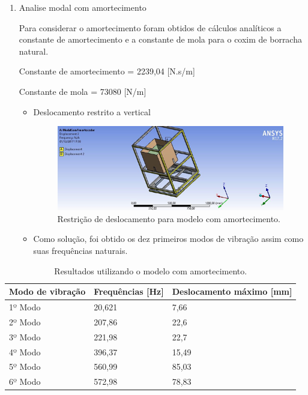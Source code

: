 \begin{enumerate}
	\item Analise modal com amortecimento
	
	Para considerar o amortecimento foram obtidos de cálculos analíticos a constante de amortecimento e a constante de mola para o coxim de borracha natural.
	
	Constante de amortecimento = 2239,04 [N.s/m]
	
	Constante de mola = 73080 [N/m]
	
	\begin{itemize}
		\item Deslocamento restrito a vertical
		
		\begin{figure}[H]
			\centering
			\includegraphics[width=350pt]{figuras/restricao2.png}
			\caption{Restrição de deslocamento para modelo com amortecimento.}
		\end{figure}
		
		\item Como solução, foi obtido os dez primeiros modos de vibração assim como suas frequências naturais.
	\end{itemize}
\end{enumerate}

\begin{table}[H]
	\centering
	\caption{Resultados utilizando o modelo com amortecimento.}
	\begin{tabular}{|l|l|l|}
		\hline
		Modo de vibração & Frequências {[}Hz{]} & Deslocamento máximo {[}mm{]} \\ \hline
		1º Modo          & 20,621               & 7,66                         \\ \hline
		2º Modo          & 207,86               & 22,6                         \\ \hline
		3º Modo          & 221,98               & 22,7                         \\ \hline
		4º Modo          & 396,37               & 15,49                        \\ \hline
		5º Modo          & 560,99               & 85,03                        \\ \hline
		6º Modo          & 572,98               & 78,83                        \\ \hline
	\end{tabular}
\end{table}

